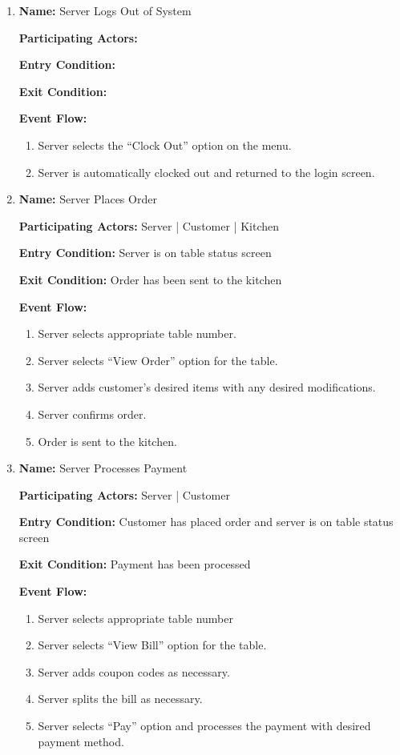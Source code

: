 \documentclass[11pt]{article}
\begin{document}
\begin{enumerate}
		\item \textbf{Name:} 				Server Logs Out of System

			\textbf{Participating Actors:} 	

			\textbf{Entry Condition:} 		

			\textbf{Exit Condition:} 		

			\textbf{Event Flow:}
			\begin{enumerate}
				\setlength{\leftskip}{1cm}
				\item Server selects the ``Clock Out'' option on the menu.
				\item Server is automatically clocked out and returned to the login screen.\\
			\end{enumerate}

		\item \textbf{Name:} 				Server Places Order

			\textbf{Participating Actors:} 	Server | Customer | Kitchen

			\textbf{Entry Condition:} 		Server is on table status screen

			\textbf{Exit Condition:} 		Order has been sent to the kitchen

			\textbf{Event Flow:}
			\begin{enumerate}
				\setlength{\leftskip}{1cm}
				\item Server selects appropriate table number.
				\item Server selects ``View Order'' option for the table.
				\item Server adds customer’s desired items with any desired modifications.
				\item Server confirms order.
				\item Order is sent to the kitchen.\\
			\end{enumerate}

		\item \textbf{Name:} 				Server Processes Payment

			\textbf{Participating Actors:} 	Server | Customer

			\textbf{Entry Condition:} 		Customer has placed order and server is on table status screen

			\textbf{Exit Condition:} 		Payment has been processed

			\textbf{Event Flow:}
			\begin{enumerate}
				\setlength{\leftskip}{1cm}
				\item Server selects appropriate table number
				\item Server selects ``View Bill'' option for the table.
				\item Server adds coupon codes as necessary.
				\item Server splits the bill as necessary.
				\item Server selects ``Pay'' option and processes the payment with desired payment method.\\
			\end{enumerate}


\end{enumerate}
\end{document}

